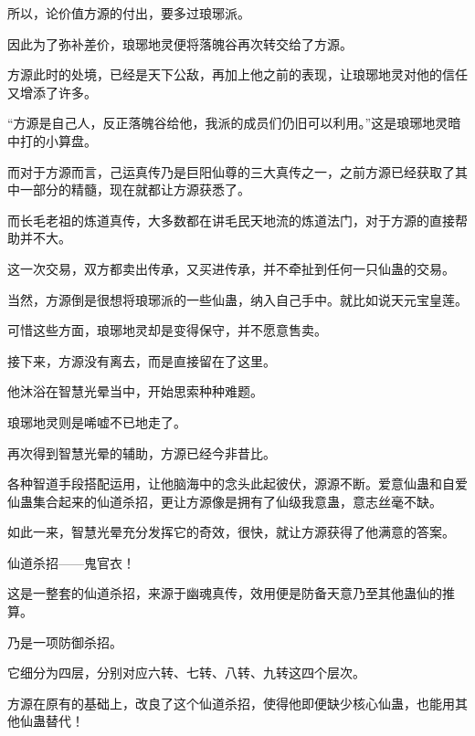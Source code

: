 \begin{this_body}
所以，论价值方源的付出，要多过琅琊派。

因此为了弥补差价，琅琊地灵便将落魄谷再次转交给了方源。

方源此时的处境，已经是天下公敌，再加上他之前的表现，让琅琊地灵对他的信任又增添了许多。

“方源是自己人，反正落魄谷给他，我派的成员们仍旧可以利用。”这是琅琊地灵暗中打的小算盘。

而对于方源而言，己运真传乃是巨阳仙尊的三大真传之一，之前方源已经获取了其中一部分的精髓，现在就都让方源获悉了。

而长毛老祖的炼道真传，大多数都在讲毛民天地流的炼道法门，对于方源的直接帮助并不大。

这一次交易，双方都卖出传承，又买进传承，并不牵扯到任何一只仙蛊的交易。

当然，方源倒是很想将琅琊派的一些仙蛊，纳入自己手中。就比如说天元宝皇莲。

可惜这些方面，琅琊地灵却是变得保守，并不愿意售卖。

接下来，方源没有离去，而是直接留在了这里。

他沐浴在智慧光晕当中，开始思索种种难题。

琅琊地灵则是唏嘘不已地走了。

再次得到智慧光晕的辅助，方源已经今非昔比。

各种智道手段搭配运用，让他脑海中的念头此起彼伏，源源不断。爱意仙蛊和自爱仙蛊集合起来的仙道杀招，更让方源像是拥有了仙级我意蛊，意志丝毫不缺。

如此一来，智慧光晕充分发挥它的奇效，很快，就让方源获得了他满意的答案。

仙道杀招——鬼官衣！

这是一整套的仙道杀招，来源于幽魂真传，效用便是防备天意乃至其他蛊仙的推算。

乃是一项防御杀招。

它细分为四层，分别对应六转、七转、八转、九转这四个层次。

方源在原有的基础上，改良了这个仙道杀招，使得他即便缺少核心仙蛊，也能用其他仙蛊替代！

\end{this_body}

